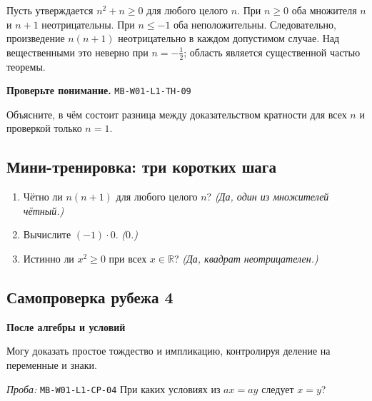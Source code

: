 \documentclass[11pt,a4paper,openany]{book}
\newcommand{\mtag}[1]{\textsf{\small\color{mbaccent}\bfseries #1}}
\newcommand{\muid}[1]{\texttt{\footnotesize #1}}
\begin{document}
Пусть утверждается $n^2+n\ge0$ для любого целого $n$. При $n\ge0$ оба множителя $n$ и $n+1$ неотрицательны. При $n\le-1$ оба неположительны. Следовательно, произведение $n(n+1)$ неотрицательно в каждом допустимом случае. Над вещественными это неверно при $n=-\tfrac12$; область является существенной частью теоремы.


\begin{center}
\end{center}

\begin{learnbox}\textbf{Проверьте понимание.} \muid{MB-W01-L1-TH-09}\par Объясните, в чём состоит разница между доказательством кратности для всех $n$ и проверкой только $n=1$.\end{learnbox}

\subsection*{Мини-тренировка: три коротких шага}
\begin{enumerate}[label=\arabic*),leftmargin=*,itemsep=3pt]

\item Чётно ли $n(n+1)$ для любого целого $n$? \textit{(Да, один из множителей чётный.)}

\item Вычислите $(-1)\cdot0$. \textit{($0$.)}

\item Истинно ли $x^2\ge0$ при всех $x\in\mathbb R$? \textit{(Да, квадрат неотрицателен.)}

\end{enumerate}

\subsection*{Самопроверка рубежа 4}\mtag{После алгебры и условий}\par Могу доказать простое тождество и импликацию, контролируя деление на переменные и знаки.\par \textit{Проба:} \muid{MB-W01-L1-CP-04} При каких условиях из $ax=ay$ следует $x=y$?
\end{document}
